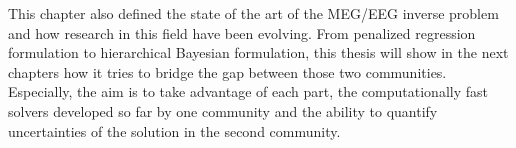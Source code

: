 This chapter also defined the state of the art of the MEG/EEG inverse problem and how research in this field have been evolving. From penalized regression formulation to hierarchical Bayesian formulation, this thesis will show in the next chapters how it tries to bridge the gap between those two communities. Especially, the aim is to take advantage of each part, the computationally fast solvers developed so far by one community and the ability to quantify uncertainties of the solution in the second community.